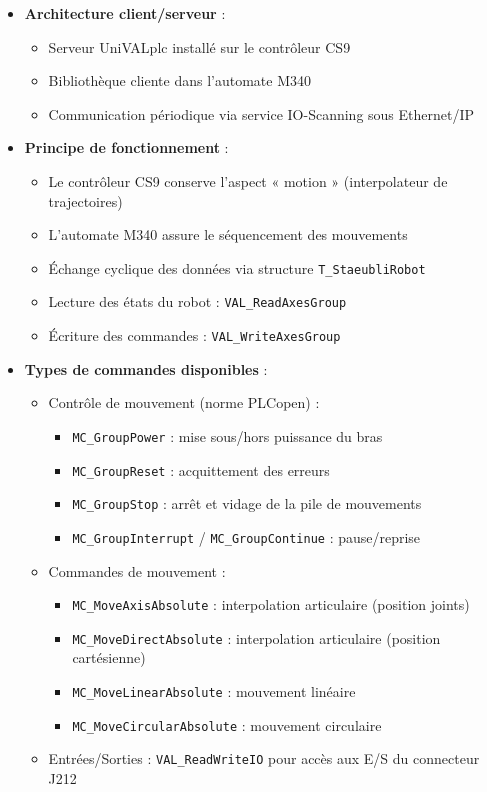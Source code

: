 \begin{itemize}
    \item \textbf{Architecture client/serveur} :
    \begin{itemize}
        \item Serveur UniVALplc installé sur le contrôleur CS9
        \item Bibliothèque cliente dans l'automate M340
        \item Communication périodique via service IO-Scanning sous Ethernet/IP
    \end{itemize}

    \item \textbf{Principe de fonctionnement} :
    \begin{itemize}
        \item Le contrôleur CS9 conserve l'aspect « motion » (interpolateur de trajectoires)
        \item L'automate M340 assure le séquencement des mouvements
        \item Échange cyclique des données via structure \texttt{T\_StaeubliRobot}
        \item Lecture des états du robot : \texttt{VAL\_ReadAxesGroup}
        \item Écriture des commandes : \texttt{VAL\_WriteAxesGroup}
    \end{itemize}

    \item \textbf{Types de commandes disponibles} :
    \begin{itemize}
        \item Contrôle de mouvement (norme PLCopen) :
        \begin{itemize}
            \item \texttt{MC\_GroupPower} : mise sous/hors puissance du bras
            \item \texttt{MC\_GroupReset} : acquittement des erreurs
            \item \texttt{MC\_GroupStop} : arrêt et vidage de la pile de mouvements
            \item \texttt{MC\_GroupInterrupt} / \texttt{MC\_GroupContinue} : pause/reprise
        \end{itemize}
        \item Commandes de mouvement :
        \begin{itemize}
            \item \texttt{MC\_MoveAxisAbsolute} : interpolation articulaire (position joints)
            \item \texttt{MC\_MoveDirectAbsolute} : interpolation articulaire (position cartésienne)
            \item \texttt{MC\_MoveLinearAbsolute} : mouvement linéaire
            \item \texttt{MC\_MoveCircularAbsolute} : mouvement circulaire
        \end{itemize}
        \item Entrées/Sorties : \texttt{VAL\_ReadWriteIO} pour accès aux E/S du connecteur J212
    \end{itemize}


\end{itemize}
